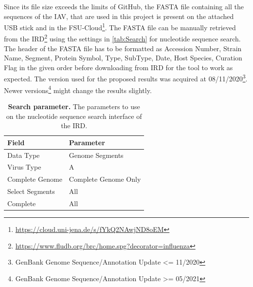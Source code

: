 Since its file size exceeds the limits of GitHub, the FASTA file containing all the sequences of the \gls{IAV}, that are used in this project is present on the attached USB stick and in the FSU-Cloud\footnote{\url{https://cloud.uni-jena.de/s/fYkQ2NAwjND8oEM}}. The FASTA file can be manually retrieved from the \gls{IRD}\footnote{\url{https://www.fludb.org/brc/home.spg?decorator=influenza}} using the settings in \autoref{tab:Search} for nucleotide sequence search. The header of the FASTA file has to be formatted as Accession Number, Strain Name, Segment, Protein Symbol, Type, SubType, Date, Host Species, Curation Flag in the given order before downloading from \gls{IRD} for the tool to work as expected. The version used for the proposed results was acquired at 08/11/2020\footnote{GenBank Genome Sequence/Annotation Update <= 11/2020}. Newer versions\footnote{GenBank Genome Sequence/Annotation Update >= 05/2021} might change the results slightly.

\begin{table}[!hbt]
    \footnotesize
    \centering
    \caption[Search parameter]{\textbf{Search parameter.} The parameters to use on the nucleotide sequence search interface of the \gls{IRD}.}
    \label{tab:Search}
    \begin{tabular*}{0.5\textwidth}{@{\extracolsep{\fill}\hspace{6pt}}ll}
        \toprule
        \textbf{Field} & \textbf{Parameter}\\
        \midrule
        Data Type & Genome Segments\\
        Virus Type & A\\
        Complete Genome & Complete Genome Only\\
        Select Segments & All\\
        Complete & All\\
        \bottomrule
    \end{tabular*}
\end{table}


